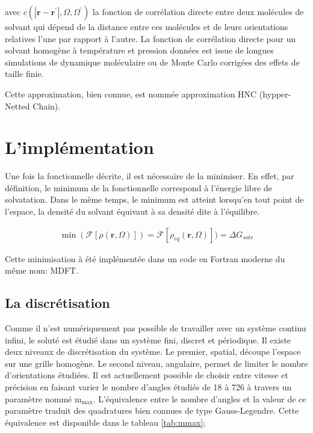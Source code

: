 \noindent avec $c\left(\left|\boldsymbol{r}-\boldsymbol{r}^\prime\right|,\Omega,\Omega^\prime \right) $ la fonction de corrélation directe entre deux molécules de solvant qui dépend de la distance entre ces molécules et de leurs orientations relatives l'une par rapport à l'autre. La fonction de corrélation directe pour un solvant homogène à température et pression données est issue de longues simulations de dynamique moléculaire ou de Monte Carlo corrigées des effets de taille finie\cite{Puibasset_bridge_2012, belloni_unpublished}.

Cette approximation, bien connue, est nommée approximation HNC (hypper-Netted Chain)\cite{hansen_theory_2006}. 


\section{L'implémentation}
Une fois la fonctionnelle décrite, il est nécessaire de la minimiser. En effet, par définition, le minimum de la fonctionnelle correspond à l'énergie libre de solvatation. Dans le même temps, le minimum est atteint lorsqu'en tout point de l'espace, la densité du solvant équivaut à sa densité dite à l'équilibre.

\begin{eqnarray}
\min(\mathcal{F}[\rho\left(\boldsymbol{r},\Omega \right)]) = \mathcal{F}[\rho_{eq}\left(\boldsymbol{r},\Omega \right)])= \Delta G_{solv}
\end{eqnarray}

Cette minimisation à été implémentée dans un code en Fortran moderne du même nom: MDFT.


\subsection{La discrétisation}
Comme il n'est numériquement pas possible de travailler avec un système continu infini, le soluté est étudié dans un système fini, discret et périodique. Il existe deux niveaux de discrétisation du système. Le premier, spatial, découpe l'espace sur une grille homogène. Le second niveau, angulaire\cite{ding_cea-01564512}, permet de limiter le nombre d'orientations étudiées. Il est actuellement possible de choisir entre vitesse et précision en faisant varier le nombre d'angles étudiés de 18 à 726 à travers un paramètre nommé $\mathrm{m}_\mathrm{max}$. L'équivalence entre le nombre d'angles et la valeur de ce paramètre traduit des quadratures bien connues de type Gauss-Legendre\cite{abbott_tricks_2005}. Cette équivalence est disponible dans le tableau \ref{tab:mmax};

